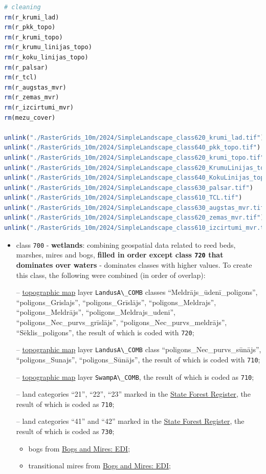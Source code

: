 \documentclass[
]{book}
\newcommand{\passthrough}[1]{#1}
\begin{document}
\begin{lstlisting}[language=R]
# cleaning
rm(r_krumi_lad)
rm(r_pkk_topo)
rm(r_krumi_topo)
rm(r_krumu_linijas_topo)
rm(r_koku_linijas_topo)
rm(r_palsar)
rm(r_tcl)
rm(r_augstas_mvr)
rm(r_zemas_mvr)
rm(r_izcirtumi_mvr)
rm(mezu_cover)

unlink("./RasterGrids_10m/2024/SimpleLandscape_class620_krumi_lad.tif")
unlink("./RasterGrids_10m/2024/SimpleLandscape_class640_pkk_topo.tif")
unlink("./RasterGrids_10m/2024/SimpleLandscape_class620_krumi_topo.tif")
unlink("./RasterGrids_10m/2024/SimpleLandscape_class620_KrumuLinijas_topo.tif")
unlink("./RasterGrids_10m/2024/SimpleLandscape_class640_KokuLinijas_topo.tif")
unlink("./RasterGrids_10m/2024/SimpleLandscape_class630_palsar.tif")
unlink("./RasterGrids_10m/2024/SimpleLandscape_class610_TCL.tif")
unlink("./RasterGrids_10m/2024/SimpleLandscape_class630_augstas_mvr.tif")
unlink("./RasterGrids_10m/2024/SimpleLandscape_class620_zemas_mvr.tif")
unlink("./RasterGrids_10m/2024/SimpleLandscape_class610_izcirtumi_mvr.tif")
\end{lstlisting}

\begin{itemize}
\item
  class \passthrough{\lstinline!700!} - \textbf{wetlands}: combining geospatial data related to reed beds,
  marshes, mires and bogs, \textbf{filled in order except class \passthrough{\lstinline!720!} that dominates over waters} -
  dominates classes with higher values. To create this class, the following were
  combined (in order of overlap):

  -- \hyperref[Ch04.04]{topographic map} layer \passthrough{\lstinline!LandusA\_COMB!} classes ``Meldrājs\_ūdenī\_poligons'',
  ``poligons\_Grislajs'', ``poligons\_Grīslājs'', ``poligons\_Meldrajs'', ``poligons\_Meldrājs'',
  ``poligons\_Meldrajs\_udeni'', ``poligons\_Nec\_purvs\_grīslājs'', ``poligons\_Nec\_purvs\_meldrājs'',
  ``Sēklis\_poligons'', the result of which is coded with \passthrough{\lstinline!720!};

  -- \hyperref[Ch04.04]{topographic map} layer \passthrough{\lstinline!LandusA\_COMB!} class ``poligons\_Nec\_purvs\_sūnājs'',
  ``poligons\_Sunajs'', ``poligons\_Sūnājs'', the result of which is coded with \passthrough{\lstinline!710!};

  -- \hyperref[Ch04.04]{topographic map} layer \passthrough{\lstinline!SwampA\_COMB!}, the result of which is coded
  as \passthrough{\lstinline!710!};

  -- land categories ``21'', ``22'', ``23'' marked in the \hyperref[Ch04.01]{State Forest Register},
  the result of which is coded as \passthrough{\lstinline!710!};

  -- land categories ``41'' and ``42'' marked in the \hyperref[Ch04.01]{State Forest Register},
  the result of which is coded as \passthrough{\lstinline!730!};

  \begin{itemize}
  \item
    bogs from \hyperref[Ch04.17]{Bogs and Mires: EDI};
  \item
    transitional mires from \hyperref[Ch04.17]{Bogs and Mires: EDI};
  \end{itemize}
\end{itemize}
\end{document}
